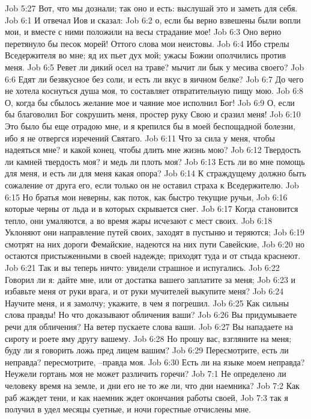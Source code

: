 Job 5:27  Вот, что мы дознали; так оно и есть: выслушай это и заметь для себя.
Job 6:1  И отвечал Иов и сказал:
Job 6:2  о, если бы верно взвешены были вопли мои, и вместе с ними положили на весы страдание мое!
Job 6:3  Оно верно перетянуло бы песок морей! Оттого слова мои неистовы.
Job 6:4  Ибо стрелы Вседержителя во мне; яд их пьет дух мой; ужасы Божии ополчились против меня.
Job 6:5  Ревет ли дикий осел на траве? мычит ли бык у месива своего?
Job 6:6  Едят ли безвкусное без соли, и есть ли вкус в яичном белке?
Job 6:7  До чего не хотела коснуться душа моя, то составляет отвратительную пищу мою.
Job 6:8  О, когда бы сбылось желание мое и чаяние мое исполнил Бог!
Job 6:9  О, если бы благоволил Бог сокрушить меня, простер руку Свою и сразил меня!
Job 6:10  Это было бы еще отрадою мне, и я крепился бы в моей беспощадной болезни, ибо я не отвергся изречений Святаго.
Job 6:11  Что за сила у меня, чтобы надеяться мне? и какой конец, чтобы длить мне жизнь мою?
Job 6:12  Твердость ли камней твердость моя? и медь ли плоть моя?
Job 6:13  Есть ли во мне помощь для меня, и есть ли для меня какая опора?
Job 6:14  К страждущему должно быть сожаление от друга его, если только он не оставил страха к Вседержителю.
Job 6:15  Но братья мои неверны, как поток, как быстро текущие ручьи,
Job 6:16  которые черны от льда и в которых скрывается снег.
Job 6:17  Когда становится тепло, они умаляются, а во время жары исчезают с мест своих.
Job 6:18  Уклоняют они направление путей своих, заходят в пустыню и теряются;
Job 6:19  смотрят на них дороги Фемайские, надеются на них пути Савейские,
Job 6:20  но остаются пристыженными в своей надежде; приходят туда и от стыда краснеют.
Job 6:21  Так и вы теперь ничто: увидели страшное и испугались.
Job 6:22  Говорил ли я: дайте мне, или от достатка вашего заплатите за меня;
Job 6:23  и избавьте меня от руки врага, и от руки мучителей выкупите меня?
Job 6:24  Научите меня, и я замолчу; укажите, в чем я погрешил.
Job 6:25  Как сильны слова правды! Но что доказывают обличения ваши?
Job 6:26  Вы придумываете речи для обличения? На ветер пускаете слова ваши.
Job 6:27  Вы нападаете на сироту и роете яму другу вашему.
Job 6:28  Но прошу вас, взгляните на меня; буду ли я говорить ложь пред лицем вашим?
Job 6:29  Пересмотрите, есть ли неправда? пересмотрите, --правда моя.
Job 6:30  Есть ли на языке моем неправда? Неужели гортань моя не может различить горечи?
Job 7:1  Не определено ли человеку время на земле, и дни его не то же ли, что дни наемника?
Job 7:2  Как раб жаждет тени, и как наемник ждет окончания работы своей,
Job 7:3  так я получил в удел месяцы суетные, и ночи горестные отчислены мне.
